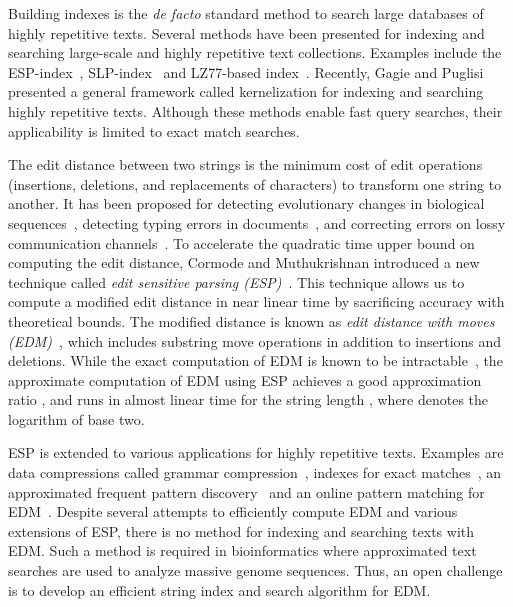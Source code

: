 \documentclass[12pt,a4paper]{scrartcl}
\begin{document}
Building indexes is the \emph{de facto} standard method to search large
databases of highly repetitive texts.  Several methods have been presented for
indexing and searching large-scale and highly repetitive text collections.
Examples include the ESP-index~\cite{Takabatake14}, SLP-index~\cite{Claude09}
and LZ77-based index~\cite{GagieGKNP14}.  Recently, Gagie and
Puglisi~\cite{Gagie:2015bj} presented a general framework called kernelization
for indexing and searching highly repetitive texts.  Although these methods
enable fast query searches, their applicability is limited to exact match
searches.

The edit distance between two strings is the minimum cost of edit operations
(insertions, deletions, and replacements of characters) to transform one
string to another. It has been proposed for detecting evolutionary changes in
biological sequences~\cite{Durbin98}, detecting typing errors in
documents~\cite{Crochemore94}, and correcting errors on lossy communication
channels~\cite{Levenshtein96}.  To accelerate the quadratic time upper bound
on computing the edit distance, Cormode and Muthukrishnan introduced a new
technique called \emph{edit sensitive parsing (ESP)}~\cite{Cormode07}.  This
technique allows us to compute a modified edit distance in near linear time by
sacrificing accuracy with theoretical bounds.  The modified distance is known
as \emph{edit distance with moves (EDM)}~\cite{Cormode07}, which includes
substring move operations in addition to insertions and deletions.
While the exact computation of EDM is known to be intractable~\cite{Shapira07},
the approximate computation of EDM using ESP achieves a good approximation ratio
, and runs in almost linear time  for the
string length , where  denotes the logarithm of base two.

ESP is extended to various applications for highly repetitive texts.  Examples
are data compressions called grammar compression~\cite{SakamotoMKS09,
  Maruyama12, Maruyama13, Maruyama14}, indexes for exact matches~\cite{ESP,
  Takabatake14, Takabatake15}, an approximated frequent pattern
discovery~\cite{Nakahara13} and an online pattern matching for
EDM~\cite{Takabatake14-2}.  Despite several attempts to efficiently compute
EDM and various extensions of ESP, there is no method for indexing and
searching texts with EDM.  Such a method is required in bioinformatics where
approximated text searches are used to analyze massive genome sequences.
Thus, an open challenge is to develop an efficient string index and search
algorithm for EDM.
\end{document}
